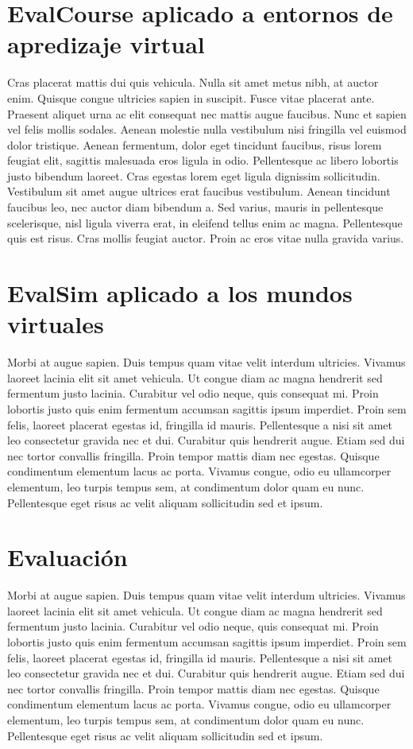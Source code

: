 \section{EvalCourse aplicado a entornos de apredizaje virtual}

Cras placerat mattis dui quis vehicula. Nulla sit amet metus nibh, at auctor enim. Quisque congue ultricies sapien in suscipit. Fusce vitae placerat ante. Praesent aliquet urna ac elit consequat nec mattis augue faucibus. Nunc et sapien vel felis mollis sodales. Aenean molestie nulla vestibulum nisi fringilla vel euismod dolor tristique. Aenean fermentum, dolor eget tincidunt faucibus, risus lorem feugiat elit, sagittis malesuada eros ligula in odio. Pellentesque ac libero lobortis justo bibendum laoreet. Cras egestas lorem eget ligula dignissim sollicitudin. Vestibulum sit amet augue ultrices erat faucibus vestibulum. Aenean tincidunt faucibus leo, nec auctor diam bibendum a. Sed varius, mauris in pellentesque scelerisque, nisl ligula viverra erat, in eleifend tellus enim ac magna. Pellentesque quis est risus. Cras mollis feugiat auctor. Proin ac eros vitae nulla gravida varius.

\section{EvalSim aplicado a los mundos virtuales}

Morbi at augue sapien. Duis tempus quam vitae velit interdum ultricies. Vivamus laoreet lacinia elit sit amet vehicula. Ut congue diam ac magna hendrerit sed fermentum justo lacinia. Curabitur vel odio neque, quis consequat mi. Proin lobortis justo quis enim fermentum accumsan sagittis ipsum imperdiet. Proin sem felis, laoreet placerat egestas id, fringilla id mauris. Pellentesque a nisi sit amet leo consectetur gravida nec et dui. Curabitur quis hendrerit augue. Etiam sed dui nec tortor convallis fringilla. Proin tempor mattis diam nec egestas. Quisque condimentum elementum lacus ac porta. Vivamus congue, odio eu ullamcorper elementum, leo turpis tempus sem, at condimentum dolor quam eu nunc. Pellentesque eget risus ac velit aliquam sollicitudin sed et ipsum. 

\section{Evaluación}

Morbi at augue sapien. Duis tempus quam vitae velit interdum ultricies. Vivamus laoreet lacinia elit sit amet vehicula. Ut congue diam ac magna hendrerit sed fermentum justo lacinia. Curabitur vel odio neque, quis consequat mi. Proin lobortis justo quis enim fermentum accumsan sagittis ipsum imperdiet. Proin sem felis, laoreet placerat egestas id, fringilla id mauris. Pellentesque a nisi sit amet leo consectetur gravida nec et dui. Curabitur quis hendrerit augue. Etiam sed dui nec tortor convallis fringilla. Proin tempor mattis diam nec egestas. Quisque condimentum elementum lacus ac porta. Vivamus congue, odio eu ullamcorper elementum, leo turpis tempus sem, at condimentum dolor quam eu nunc. Pellentesque eget risus ac velit aliquam sollicitudin sed et ipsum. 

